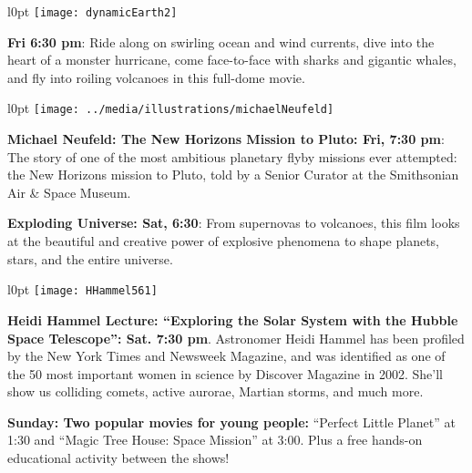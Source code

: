 \documentclass{article}
\begin{document}
   {\fontsize{19}{19}

     \begin{wrapfigure}[5]{l}{0pt}
       \texttt{[image: dynamicEarth2]}
     \end{wrapfigure}      
     
      \textbf{Fri  6:30 pm}: Ride along on swirling ocean and wind currents, dive into the heart of a monster hurricane, come face-to-face with sharks and gigantic whales, and fly into roiling volcanoes in this full-dome movie.


\medskip

   \begin{wrapfigure}[6]{l}{0pt}
      \texttt{[image: ../media/illustrations/michaelNeufeld]}
   \end{wrapfigure}      
   
   \textbf{Michael Neufeld: The New Horizons Mission to Pluto: Fri, 7:30 pm}: 
      The story of one of the most ambitious planetary flyby missions ever attempted: the New Horizons mission to Pluto,
      told by a Senior Curator at the Smithsonian Air \& Space Museum.
      



\medskip

     \textbf{Exploding Universe: Sat, 6:30}: From supernovas to volcanoes, this film looks at the beautiful and creative power of explosive phenomena to shape planets, stars, and the entire universe.


\medskip

 \begin{wrapfigure}[6]{l}{0pt}
   \texttt{[image: HHammel561]}
 \end{wrapfigure}      

   \textbf{Heidi Hammel Lecture: “Exploring the Solar System with the Hubble Space Telescope”: Sat. 7:30 pm}. 
Astronomer Heidi Hammel has been profiled by the New York Times and Newsweek Magazine, and was identified as one of the 50 most important women in science by Discover Magazine in 2002. She’ll show us colliding comets, active aurorae, Martian storms, and much more.

\medskip

\textbf{Sunday: Two popular movies for young people:} “Perfect Little Planet” at 1:30 and “Magic Tree House: 
Space Mission” at 3:00. Plus a free hands-on educational activity between the shows!

}
\end{document}
